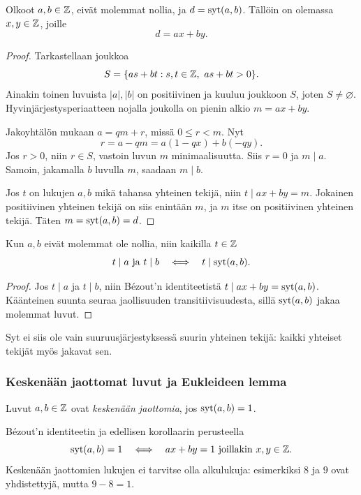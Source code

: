 \documentclass[11pt,a4paper]{amsart}
\begin{document}
\begin{theorem}
  Olkoot $a,b\in\mathbb{Z}$, eivät molemmat nollia, ja $d=\operatorname{syt}(a,b)$.
  Tällöin on olemassa $x,y\in\mathbb{Z}$, joille
  \[
    \boxed{d=ax+by.}
  \]
\end{theorem}
\begin{proof}
  Tarkastellaan joukkoa
  \[
    S=\{as+bt:s,t\in\mathbb{Z},\ as+bt>0\}.
  \]
  Ainakin toinen luvuista $|a|,|b|$ on positiivinen ja kuuluu
  joukkoon $S$, joten $S\ne\varnothing$. Hyvinjärjestysperiaatteen
  nojalla joukolla on pienin alkio $m=ax+by$.

  Jakoyhtälön mukaan $a=qm+r$, missä $0\le r<m$. Nyt
  \[
    r=a-qm=a(1-qx)+b(-qy).
  \]
  Jos $r>0$, niin $r\in S$, vastoin luvun $m$ minimaalisuutta.
  Siis $r=0$ ja $m\mid a$. Samoin, jakamalla $b$ luvulla $m$,
  saadaan $m\mid b$.

  Jos $t$ on lukujen $a,b$ mikä tahansa yhteinen tekijä, niin
  $t\mid ax+by=m$. Jokainen positiivinen yhteinen tekijä on siis
  enintään $m$, ja $m$ itse on positiivinen yhteinen tekijä.
  Täten $m=\operatorname{syt}(a,b)=d$.
\end{proof}

\begin{corollary}\label{cor:nt-common-divisors}
  Kun $a,b$ eivät molemmat ole nollia, niin kaikilla $t\in\mathbb{Z}$
  \[
    t\mid a\ \text{ja}\ t\mid b
    \quad\Longleftrightarrow\quad t\mid\operatorname{syt}(a,b).
  \]
\end{corollary}
\begin{proof}
  Jos $t\mid a$ ja $t\mid b$, niin Bézout'n identiteetistä
  $t\mid ax+by=\operatorname{syt}(a,b)$. Käänteinen suunta seuraa jaollisuuden
  transitiivisuudesta, sillä $\operatorname{syt}(a,b)$ jakaa molemmat luvut.
\end{proof}
Syt ei siis ole vain suuruusjärjestyksessä suurin yhteinen tekijä:
kaikki yhteiset tekijät myös jakavat sen.

\subsubsection{Keskenään jaottomat luvut ja Eukleideen lemma}
\begin{definition}
  Luvut $a,b\in\mathbb{Z}$ ovat \emph{keskenään jaottomia}, jos
  $\operatorname{syt}(a,b)=1$.
\end{definition}
Bézout'n identiteetin ja edellisen korollaarin perusteella
\[
  \operatorname{syt}(a,b)=1
  \quad\Longleftrightarrow\quad
  ax+by=1\ \text{joillakin }x,y\in\mathbb{Z}.
\]
Keskenään jaottomien lukujen ei tarvitse olla alkulukuja:
esimerkiksi $8$ ja $9$ ovat yhdistettyjä, mutta $9-8=1$.
\end{document}
